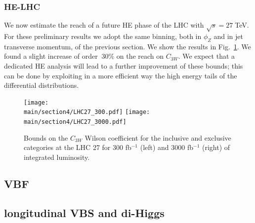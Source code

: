 \documentclass[../report.tex]{subfiles}
\providecommand{\main}{..}
\begin{document}
\subsubsection*{HE-LHC}


We now estimate the reach of a future HE phase of the LHC with
$\sqrt{s}=27\;$TeV. For these preliminary results we adopt the same binning, both in $\phi_Z$ and in jet transverse momentum, of the previous section. We show the results in Fig.~\ref{fig:LHC27}. We found a slight increase of order $~30\%$ on the reach on $C_{3W}$. We expect that a dedicated HE analysis will lead to a further improvement of these bounds; this can be done by exploiting in a more efficient way the high energy tails of the differential distributions.  


  \begin{figure}[h!]
\begin{center}
 \texttt{[image: \\main/section4/LHC27\_300.pdf]}{}\hspace{2cm}
 \texttt{[image: \\main/section4/LHC27\_3000.pdf]}{}
\end{center}
\caption{Bounds on the $C_{3W}$ Wilson coefficient for the inclusive and exclusive categories at the LHC 27 for 300 fb$^{-1}$ (left) and 3000 fb$^{-1}$ (right) of integrated luminosity.}
\label{fig:LHC27}
\end{figure}



\subsection{VBF}
\subsection{longitudinal VBS and di-Higgs} 
\end{document}
